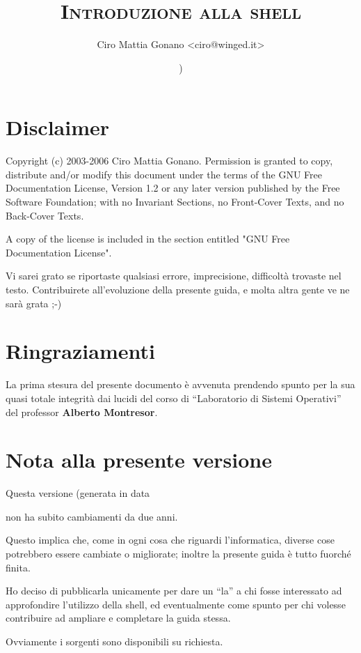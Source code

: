 \documentclass[a4paper,10pt]{report}
\title{\textsc{\textbf{Introduzione alla shell}}}
\author{Ciro Mattia Gonano <ciro@winged.it>}
\date{}
\begin{document}
\maketitle

\section{Disclaimer}

Copyright (c) 2003-2006 Ciro Mattia Gonano.
Permission is granted to copy, distribute and/or modify this document under
the terms of the GNU Free Documentation License, Version 1.2 or any later
version published by the Free Software Foundation; with no Invariant Sections,
no Front-Cover Texts, and no Back-Cover Texts.

A copy of the license is included in the section entitled "GNU Free
Documentation License".

\medskip
Vi sarei grato se riportaste qualsiasi errore, imprecisione, difficolt\`a
trovaste nel testo. Contribuirete all'evoluzione della presente guida, e molta
altra gente ve ne sar\`a grata ;-)

\section{Ringraziamenti}
La prima stesura del presente documento \`e avvenuta prendendo spunto per la
sua quasi totale integrit\`a dai lucidi del corso di ``Laboratorio di Sistemi
Operativi'' del professor \textbf{Alberto Montresor}.

\section{Nota alla presente versione}

Questa versione (generata in data \date) non ha subito cambiamenti da due anni.

Questo implica che, come in ogni cosa che riguardi l'informatica, diverse cose
potrebbero essere cambiate o migliorate; inoltre la presente guida \`e tutto
fuorch\'e finita.

Ho deciso di pubblicarla unicamente per dare un ``la'' a chi fosse interessato
ad approfondire l'utilizzo della shell, ed eventualmente come spunto per chi
volesse contribuire ad ampliare e completare la guida stessa.

Ovviamente i sorgenti sono disponibili su richiesta.

\tableofcontents







\appendix

\end{document}
